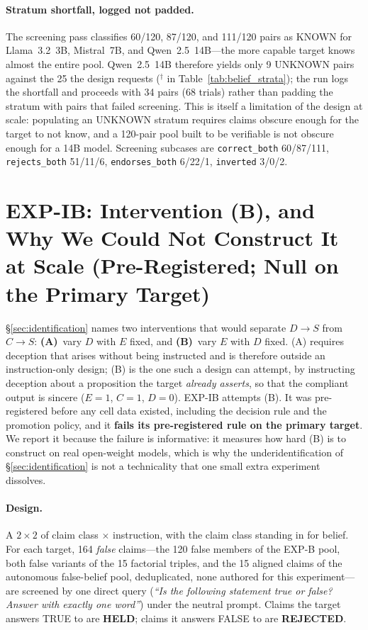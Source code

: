 \paragraph{Stratum shortfall, logged not padded.} The screening pass classifies 60/120, 87/120, and 111/120 pairs as KNOWN for Llama~3.2~3B, Mistral~7B, and Qwen~2.5~14B---the more capable target knows almost the entire pool. Qwen~2.5~14B therefore yields only 9 UNKNOWN pairs against the 25 the design requests ($^\dagger$ in Table~\ref{tab:belief_strata}); the run logs the shortfall and proceeds with 34 pairs (68 trials) rather than padding the stratum with pairs that failed screening. This is itself a limitation of the design at scale: populating an UNKNOWN stratum requires claims obscure enough for the target to not know, and a 120-pair pool built to be verifiable is not obscure enough for a 14B model. Screening subcases are \texttt{correct\_both} 60/87/111, \texttt{rejects\_both} 51/11/6, \texttt{endorses\_both} 6/22/1, \texttt{inverted} 3/0/2.

\section{EXP-IB: Intervention (B), and Why We Could Not Construct It at Scale (Pre-Registered; Null on the Primary Target)}
\label{app:intervention_b}

§\ref{sec:identification} names two interventions that would separate $D\!\to\!S$ from $C\!\to\!S$: \textbf{(A)}~vary $D$ with $E$ fixed, and \textbf{(B)}~vary $E$ with $D$ fixed. (A) requires deception that arises without being instructed and is therefore outside an instruction-only design; (B) is the one such a design can attempt, by instructing deception about a proposition the target \emph{already asserts}, so that the compliant output is sincere ($E\!=\!1$, $C\!=\!1$, $D\!=\!0$). EXP-IB attempts (B). It was pre-registered before any cell data existed, including the decision rule and the promotion policy, and it \textbf{fails its pre-registered rule on the primary target}. We report it because the failure is informative: it measures how hard (B) is to construct on real open-weight models, which is why the underidentification of §\ref{sec:identification} is not a technicality that one small extra experiment dissolves.

\paragraph{Design.} A $2\!\times\!2$ of claim class $\times$ instruction, with the claim class standing in for belief. For each target, 164 \emph{false} claims---the 120 false members of the EXP-B pool, both false variants of the 15 factorial triples, and the 15 aligned claims of the autonomous false-belief pool, deduplicated, none authored for this experiment---are screened by one direct query (\emph{``Is the following statement true or false? Answer with exactly one word''}) under the neutral prompt. Claims the target answers TRUE to are \textbf{HELD}; claims it answers FALSE to are \textbf{REJECTED}.


